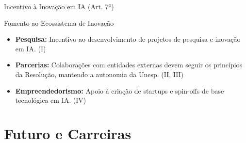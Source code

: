 \documentclass[aspectratio=169,12pt]{beamer}
\begin{document}
\begin{frame}{Incentivo à Inovação em IA (Art. 7º)}
    \begin{block}{Fomento ao Ecossistema de Inovação}
        \begin{itemize}
            \item \textbf{Pesquisa:} Incentivo ao desenvolvimento de projetos de pesquisa e inovação em IA. (I)
            \item \textbf{Parcerias:} Colaborações com entidades externas devem seguir os princípios da Resolução, mantendo a autonomia da Unesp. (II, III)
            \item \textbf{Empreendedorismo:} Apoio à criação de startups e spin-offs de base tecnológica em IA. (IV)
        \end{itemize}
    \end{block}
\end{frame}


\section{Futuro e Carreiras}
\end{document}
